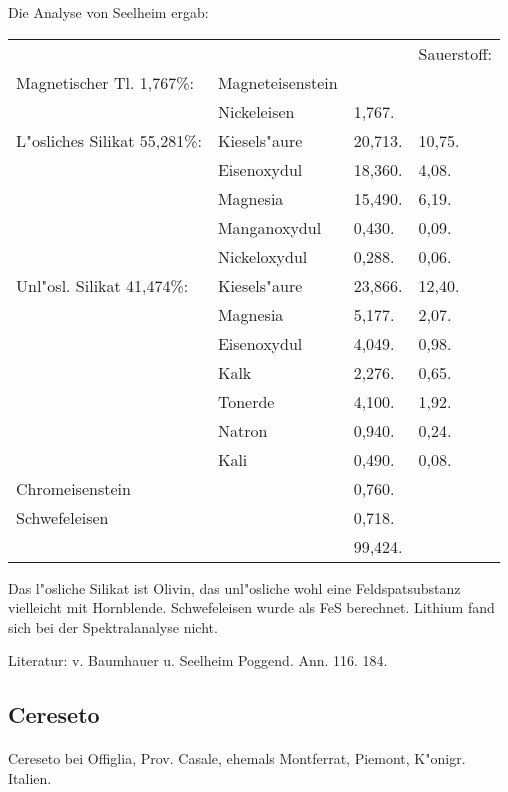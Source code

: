\documentclass[a4paper, 11pt, oneside]{article}
\begin{document}
Die Analyse von Seelheim ergab:
\begin{table}[!ht]
    \centering
    \begin{tabular}{l l l l}
        & & & Sauerstoff: \\
        Magnetischer Tl. 1,767\%: & Magneteisenstein & &   \\
         & Nickeleisen & 1,767. & \\ \hline
        L"osliches Silikat 55,281\%: & Kiesels"aure & 20,713. & 10,75. \\
         & Eisenoxydul & 18,360. & 4,08. \\
         & Magnesia & 15,490. & 6,19.  \\
         & Manganoxydul & 0,430. & 0,09. \\
         & Nickeloxydul & 0,288. & 0,06. \\ \hline
        Unl"osl. Silikat 41,474\%: & Kiesels"aure & 23,866. & 12,40. \\
         & Magnesia & 5,177. & 2,07. \\
         & Eisenoxydul & 4,049. & 0,98. \\
         & Kalk & 2,276. & 0,65. \\
         & Tonerde & 4,100. & 1,92. \\
         & Natron & 0,940. & 0,24. \\
         & Kali & 0,490. & 0,08. \\ \hline
        Chromeisenstein & & 0,760. & \\
        Schwefeleisen & & 0,718. & \\ \hline
         & & 99,424. & \\
    \end{tabular}
\end{table}

Das l"osliche Silikat ist Olivin, das unl"osliche wohl eine Feldspatsubstanz vielleicht mit Hornblende. Schwefeleisen wurde als FeS berechnet. Lithium fand sich bei der Spektralanalyse nicht.

\footnotesize
Literatur: v. Baumhauer u. Seelheim Poggend. Ann. 116. 184.

\subsection{Cereseto}
\normalsize
\paragraph{}
Cereseto bei Offiglia, Prov. Casale, ehemals Montferrat, Piemont, K"onigr. Italien.
\end{document}
